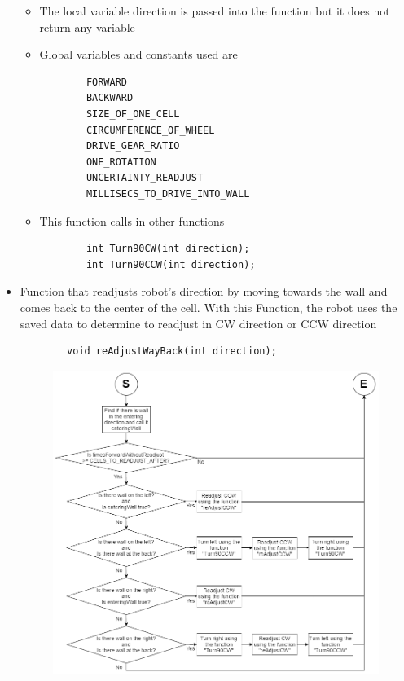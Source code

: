 \documentclass[11pt]{article}
\begin{document}
\begin{itemize}
\begin{figure}[htp]
\label{}
\end{figure}
	\begin{itemize}
	\item The local variable direction is passed into the function but it does not return any variable
	\item Global variables and constants used are
	\begin{verbatim}
		FORWARD
		BACKWARD
		SIZE_OF_ONE_CELL
		CIRCUMFERENCE_OF_WHEEL
		DRIVE_GEAR_RATIO
		ONE_ROTATION
		UNCERTAINTY_READJUST
		MILLISECS_TO_DRIVE_INTO_WALL
	\end{verbatim}
	\item This function calls in other functions
	\begin{verbatim}
		int Turn90CW(int direction);
		int Turn90CCW(int direction);
	\end{verbatim}
	\end{itemize}
\newpage
\item Function that readjusts robot's direction by moving towards the wall and comes back to the center of the cell. With this Function, the robot uses the saved data to determine to readjust in CW direction or CCW direction
	\begin{verbatim}
		void reAdjustWayBack(int direction);
	\end{verbatim}
\begin{figure}[htp]
\centering
\includegraphics[scale=0.46]{images/Software_Flowchart/reAdjustWayBack.png}

\end{figure}
\end{itemize}
\end{document}
